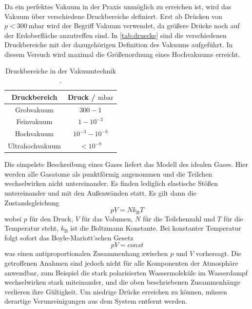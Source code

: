 Da ein perfektes Vakuum in der Praxis unmöglich zu erreichen ist, wird das Vakuum über verschiedene
Druckbereiche definiert. Erst ab Drücken von $p < \qty{300}{\milli\bar}$ wird der Begriff Vakuum verwendet,
da größere Drücke noch auf der Erdoberfläche anzutreffen sind.
In \autoref{tab:druecke} sind die verschiedenen Druckbereiche mit der dazugehörigen Definition des Vakuums
aufgeführt. In diesem Versuch wird maximal die Größenordnung eines Hochvakuums erreicht.
\begin{table}[H]
    \centering
    \caption{Druckbereiche in der Vakuumtechnik \cite{Pfeiffer_Vakuum}.}
    \label{tab:druecke}
    \begin{tabular}{c|c}
        \toprule
        Druckbereich & Druck / $\unit{\milli\bar}$\\
        \midrule
        Grobvakuum & $300 - 1$\\
        Feinvakuum & $1 - 10^{-3}$\\
        Hochvakuum & $10^{-3} - 10^{-8}$\\
        Ultrahochvakuum & $<10^{-8}$\\
        \bottomrule
    \end{tabular}
\end{table}
Die simpelste Beschreibung eines Gases liefert das Modell des idealen Gases. Hier werden alle Gasatome als punktförmig angenommen und
die Teilchen wechselwirken nicht untereinander. Es finden lediglich elastische Stößen untereinander und mit den Außenwänden statt.
Es gilt dann die Zustandsgleichung
\begin{equation}
    \label{eqn:gasgleichung}
    p V=N k_{\text{B}} T
\end{equation}
wobei $p$ für den Druck, $V$ für das Volumen, $N$ für die Teilchenzahl und $T$ für die Temperatur steht, $k_{\text{B}}$ ist die Boltzmann Konstante.
Bei konstanter Temperatur folgt sofort das Boyle-Mariott’schen Gesetz
\begin{equation}
    \label{eqn:bmgesetz}
    p V=const
\end{equation}
was einen antiproportionalen Zusammenhang zwischen $p$ und $V$ vorhersagt.
Die getroffenen Anahmen sind jedoch nicht für alle Komponenten der Atmosphäre anwendbar, zum Beispiel die stark polarisierten
Wassermoleküle im Wasserdampf wechselwirken stark miteinander, und die oben beschriebenen Zusammenhänge verlieren ihre Gültigkeit.
Um niedrige Drücke erreichen zu können, müssen derartige Verunreinigungen aus dem System entfernt werden.\\

